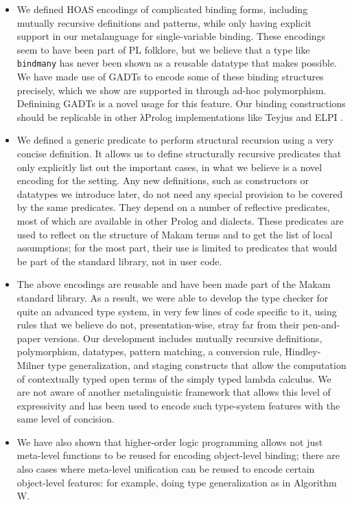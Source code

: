 \begin{itemize}
\item
  We defined HOAS encodings of complicated binding forms, including
  mutually recursive definitions and patterns, while only having
  explicit support in our metalanguage for single-variable binding.
  These encodings seem to have been part of PL folklore, but we believe
  that a type like \texttt{bindmany} has never been shown as a reusable
  datatype that \lamprolog makes possible. We have made use of GADTs to
  encode some of these binding structures precisely, which we show are
  supported in \lamprolog through ad-hoc polymorphism. Definining GADTs
  is a novel usage for this \lamprolog feature. Our binding
  constructions should be replicable in other \foreignlanguage{greek}{λ}Prolog implementations
  like Teyjus \citep{teyjus-main-reference,teyjus-2-implementation} and
  ELPI \citep{elpi-main-reference}.
\item
  We defined a generic predicate to perform structural recursion using a
  very concise definition. It allows us to define structurally recursive
  predicates that only explicitly list out the important cases, in what
  we believe is a novel encoding for the \lamprolog
   setting. Any new definitions, such as constructors or datatypes we
  introduce later, do not need any special provision to be covered by
  the same predicates. They depend on a number of reflective predicates,
  most of which are available in other Prolog and \lamprolog dialects.
  These predicates are used to reflect on the structure of Makam terms
  and to get the list of local assumptions; for the most part, their use
  is limited to predicates that would be part of the standard library,
  not in user code.
\item
  The above encodings are reusable and have been made part of the Makam
  standard library. As a result, we were able to develop the type
  checker for quite an advanced type system, in very few lines of code
  specific to it, using rules that we believe do not, presentation-wise,
  stray far from their pen-and-paper versions. Our development includes
  mutually recursive definitions, polymorphism, datatypes, pattern
  matching, a conversion rule, Hindley-Milner type generalization, and
  staging constructs that allow the computation of contextually typed
  open terms of the simply typed lambda calculus. We are not aware of
  another metalinguistic framework that allows this level of
  expressivity and has been used to encode such type-system features
  with the same level of concision.
\item
  We have also shown that higher-order logic programming allows not just
  meta-level functions to be reused for encoding object-level binding;
  there are also cases where meta-level unification can be reused to
  encode certain object-level features: for example, doing type
  generalization as in Algorithm W.
\end{itemize}

